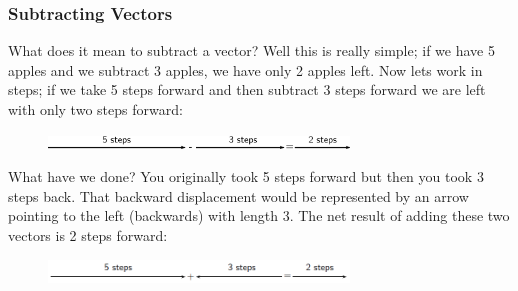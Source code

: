      \label{m38813*uid36}
            \subsubsection{ Subtracting Vectors}
            \nopagebreak
            
        
        \label{m38813*id188826}What does it mean to subtract a vector? Well this is really simple; if
we have 5 apples and we subtract 3 apples, we have only 2 apples left. Now
lets work in steps; if we take 5 steps forward and then subtract 3 steps
forward we are left with only two steps forward:\par 
        \label{m38813*id188832}
    \setcounter{subfigure}{0}


	\begin{figure}[H] %
    \begin{center}
    \label{m38813*id188835!!!underscore!!!media}\label{m38813*id188835!!!underscore!!!printimage}\includegraphics[width=8cm]{col11305.imgs/m38813_PG11C1_029.png} %
        
      \vspace{2pt}
    \vspace{.1in}
    
    \end{center}

 \end{figure}   

    \addtocounter{footnote}{-0}
    
        \par 
        \label{m38813*id188842}What have we done? You originally took 5 steps forward but then you took
3 steps back. That backward displacement would be represented by an arrow
pointing to the left (backwards) with length 3. The net result of
adding these two vectors is 2 steps forward:\par 
        \label{m38813*id188847}
          
    \setcounter{subfigure}{0}


	\begin{figure}[H] %
    \begin{center}
    \label{m38813*id188851!!!underscore!!!media}\label{m38813*id188851!!!underscore!!!printimage}\includegraphics[width=8cm]{col11305.imgs/m38813_PG11C1_030.png} %
        
      \vspace{2pt}
    \vspace{.1in}
    
    \end{center}

 \end{figure}   

